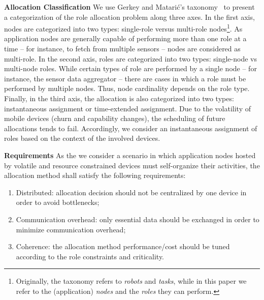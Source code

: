 \textbf{Allocation Classification} We use Gerkey and Matarić’s taxonomy~\cite{} to present a categorization of the role allocation problem along three axes. In the first axis, nodes are categorized into two types: single-role versus multi-role nodes\footnote{Originally, the taxonomy refers to \textit{robots} and \textit{tasks}, while in this paper we refer to the (application) \textit{nodes} and the \textit{roles} they can perform.}. As application nodes are generally capable of performing more than one role at a time -- for instance, to fetch from multiple sensors -- nodes are considered as multi-role. In the second axis, roles are categorized into two types: single-node vs multi-node roles. While certain types of role are performed by a single node -- for instance, the sensor data aggregator -- there are cases in which a role must be performed by multiple nodes. Thus, node cardinality depends on the role type. Finally, in the third axis, the allocation is also categorized into two types: instantaneous assignment or time-extended assignment. Due to the volatility of mobile devices (churn and capability changes), the scheduling of future allocations tends to fail. Accordingly, we consider an instantaneous assignment of roles based on the context of the involved devices.



\textbf{Requirements} As the we consider a scenario in which application nodes hosted by volatile and resource constrained devices must self-organize their activities, the allocation method shall satisfy the following requirements:

\begin{enumerate}[label=R\arabic*.]
	
	\item Distributed: allocation decision should not be centralized by one device in order to avoid bottlenecks;
	
	\item Communication overhead: only essential data should be exchanged in order to minimize communication overhead; 
	
	\item Coherence: the allocation method performance/cost should be tuned according to the role constraints and criticality.
	  
\end{enumerate} 

